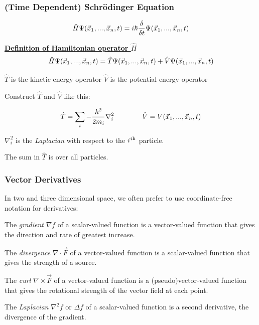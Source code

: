 \documentclass{beamer}
\begin{document}
\begin{frame}
\frametitle{(Time Dependent) Schr\"odinger Equation}
\begin{block}{}
\[ \hat{H} \Psi(\vec{x}_1,...,\vec{x}_n,t) = i \hbar \frac{\delta}{\delta t} \Psi(\vec{x}_1,...,\vec{x}_n,t) \]
\end{block}
\begin{center}
\underline{{\bf Definition of Hamiltonian operator $\hat{H}$}}
\[ \hat{H} \Psi(\vec{x}_1,...,\vec{x}_n,t) = \hat{T} \Psi(\vec{x}_1,...,\vec{x}_n,t) + \hat{V} \Psi(\vec{x}_1,...,\vec{x}_n,t) \]

$\hat{T}$ is the kinetic energy operator \qquad
$\hat{V}$ is the potential energy operator

\vskip 12pt

Construct $\hat{T}$ and $\hat{V}$ like this:

\[\hat{T} = \sum_i - \frac{\hbar^2}{2m_i}\nabla_i^2 \qquad\qquad \hat{V} = V(\vec{x}_1,...,\vec{x}_n,t)\]

$\nabla_i^2$ is the {\it Laplacian} with respect to the $i\hspace{0.05em}^{\rm th}$ particle.

\vskip 12pt

The sum in $\hat{T}$ is over all particles.

\end{center}

\end{frame}

\begin{frame}
\frametitle{Vector Derivatives}

In two and three dimensional space, we often prefer to use coordinate-free notation for derivatives:

\vskip 12pt

The {\it gradient} $\nabla f$ of a scalar-valued function is a vector-valued function that gives the direction and rate of greatest increase.

\vskip 12pt

The {\it divergence} $\nabla \cdot \vec{F}$ of a vector-valued function is a scalar-valued function that gives the strength of a source.

\vskip 12pt

The {\it curl} $\nabla \times \vec{F}$ of a vector-valued function is a (pseudo)vector-valued function that gives the rotational strength of the vector field at each point.

\vskip 12pt

The {\it Laplacian} $\nabla^2 f$ or $\Delta f$ of a scalar-valued function is a second derivative, the divergence of the gradient.

\end{frame}
\end{document}
